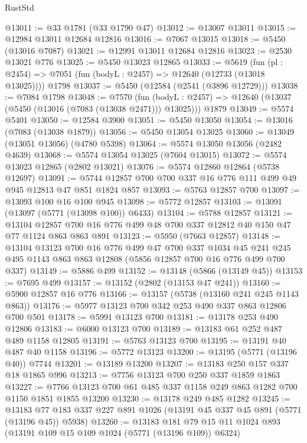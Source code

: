 \begin{lexlean}{RustStd}
\begin{coremodule}
@13011 := @33 @1781 (@33 @1790 @47)
@13012 := @13007 @13011
@13015 := @12984 @13011 @12684 @12816
@13016 := @7067 @13015
@13018 := @5450 (@13016 @7087)
@13021 := @12991 @13011 @12684 @12816
@13023 := @2530 @13021 @776
@13025 := @5450 @13023 @12865
@13033 := @5619
    (fun (pl : @2454) => @7051 (fun (bodyL : @2457) => @12640 (@12733 (@13018 @13025))))
    @1798
@13037 := @5450 (@12584 (@2541 (@3896 @12729)))
@13038 := @7084 @1798
@13048 := @7570
    (fun (bodyL : @2457) => @12640 (@13037 (@5450 (@13016 (@7083 (@13038 @2471))) @13025)))
    @1879
@13049 := @5574 @5401
@13050 := @12584 @3900
@13051 := @5450 @13050
@13054 := @13016 (@7083 (@13038 @1879))
@13056 := @5450 @13054 @13025
@13060 := @13049 (@13051 @13056) (@4780 @5398)
@13064 := @5574 @13050 @13056 (@2482 @4639)
@13068 := @5574 @13054 @13025 (@7604 @13015)
@13072 := @5574 @13023 @12865 (@2802 @13021)
@13076 := @5574 @12860 @12864 (@5738 @12697)
@13091 := @5744 @12857 @700 @700 @337 @16 @776 @111 @499 @49 @945 @12813 @47 @851 @1824 @857
@13093 := @5763 @12857 @700
@13097 := @13093 @100 @16 @100 @945
@13098 := @5772 @12857
@13103 := @13091 (@13097 (@5771 (@13098 @100)) @6433)
@13104 := @5788 @12857
@13121 := @13104
    @12857
    @700
    @16
    @776
    @499
    @48
    @700
    @337
    @12812
    @40
    @150
    @47
    @77
    @1124
    @863
    @863
    @891
@13123 := @5950 (@7663 @12857)
@13148 := @13104
    @13123
    @700
    @16
    @776
    @499
    @47
    @700
    @337
    @1034
    @45
    @241
    @245
    @495
    @1143
    @863
    @863
    @12808
    (@5856 @12857 @700 @16 @776 @499 @700 @337)
@13149 := @5886 @499
@13152 := @13148 (@5866 (@13149 @45))
@13153 := @7695 @499
@13157 := @13152 (@2802 (@13153 @47 @241))
@13160 := @5900 @12857 @16 @776
@13166 := @13157 (@5738 (@13160 @241 @245 @1143 @863))
@13176 := @5977 @13123 @700 @342 @253 @490 @337 @863 @12806 @700 @501
@13178 := @5991 @13123 @700
@13181 := @13178 @253 @490 @12806
@13183 := @6000 @13123 @700
@13189 := @13183 @61 @252 @487 @489 @1158 @12805
@13191 := @5763 @13123 @700
@13195 := @13191 @40 @487 @40 @1158
@13196 := @5772 @13123
@13200 := @13195 (@5771 (@13196 @40)) @7744
@13201 := @13189 @13200
@13207 := @13183 @250 @157 @337 @18 @1865 @996
@13213 := @7756 @13123 @700 @250 @337 @1859 @1863
@13227 := @7766 @13123 @700 @61 @485 @337 @1158 @249 @863 @1282 @700 @1150 @1851 @1855 @13200
@13230 := @13178 @249 @485 @1282
@13245 := @13183 @77 @183 @337 @227 @891 @1026 (@13191 @45 @337 @45 @891 (@5771 (@13196 @45)) @5938)
@13260 := @13183
    @181
    @79
    @15
    @11
    @1024
    @893
    (@13191 @109 @15 @109 @1024 (@5771 (@13196 @109)) @6324)

\end{coremodule}
\end{lexlean}
